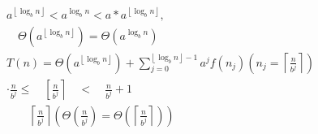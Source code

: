 $$
\begin{array}{c}
a^{\left\lfloor\log _{b} n\right\rfloor}<a^{\log _{b} n}<a * a^{\left\lfloor\log _{b} n\right\rfloor}, \\\quad \Theta\left(a^{\left\lfloor\log _{b} n\right\rfloor}\right)=\Theta\left(a^{\log _{b} n}\right)\\T(n)= 
\Theta\left(a^{\left\lfloor\log _{b} n\right\rfloor}\right)+\sum_{j=0}^{\left\lfloor\log _{b} n\right\rfloor-1} a^{j} f\left(n_{j}\right)\left(n_{j}=\left\lceil\frac{n}{b^{j}}\right\rceil\right) \\
\cdot \frac{n}{b^{j}} \leq \quad\left[\frac{n}{b^{j}}\right\rceil \quad<\quad \frac{n}{b^{j}}+1\\ \quad  \quad  \left\lceil\frac{n}{b^{j}}\right\rceil\left(\Theta\left(\frac{n}{b^{j}}\right)=\right. 
\left.\Theta\left(\left\lceil\frac{n}{b^{j}}\right\rceil\right)\right) 
\end{array}
$$


